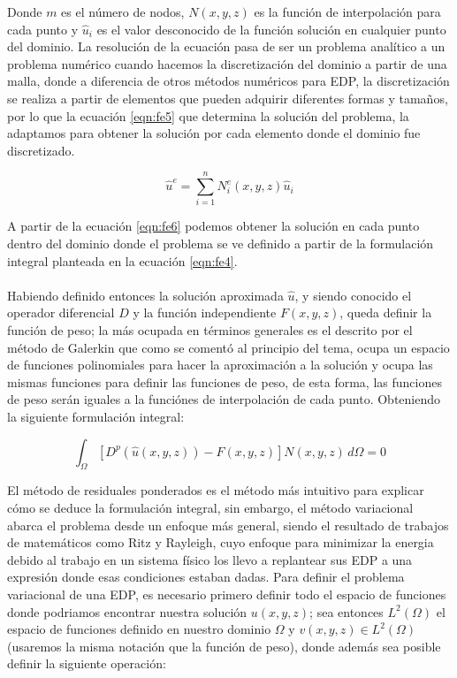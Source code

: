 Donde $m$ es el número de nodos, $N(x,y,z)$ es la función de interpolación para cada punto y $\hat{u}_{i}$ es el valor desconocido de la función solución en cualquier punto del dominio. La resolución de la ecuación pasa de ser un problema analítico a un problema numérico cuando hacemos la discretización del dominio a partir de una malla, donde a diferencia de otros métodos numéricos para EDP, la discretización se realiza a partir de elementos que pueden adquirir diferentes formas y tamaños, por lo que la ecuación \ref{eqn:fe5} que determina la solución del problema, la adaptamos para obtener la solución por cada elemento donde el dominio fue discretizado. 

\begin{equation}
\label{eqn:fe6}
    \hat{u}^{e}=\displaystyle\sum_{i=1}^n  N_{i}^{e}(x,y,z){\hat{u}_{i}}        
\end{equation}

A partir de la ecuación \ref{eqn:fe6} podemos obtener la solución en cada punto dentro del dominio donde el problema se ve definido a partir de la formulación integral planteada en la ecuación \ref{eqn:fe4}. 
\\
\\
Habiendo definido entonces la solución aproximada $\hat{u}$, y siendo conocido el operador diferencial $D$ y la función independiente $F(x,y,z)$, queda definir la función de peso; la más ocupada en términos generales es el descrito por el método de Galerkin que como se comentó al principio del tema, ocupa un espacio de funciones polinomiales para hacer la aproximación a la solución y ocupa las mismas funciones para definir las funciones de peso, de esta forma, las funciones de peso serán iguales a la funciónes de interpolación de cada punto. Obteniendo la siguiente formulación integral:

\begin{equation}
\label{eqn:fe7}
  \displaystyle\int_{\Omega}^{} [D^{p}(\hat{u}(x,y,z))-F(x,y,z)] N(x,y,z)\, d\Omega = 0      
\end{equation}
  
El método de residuales ponderados es el método más intuitivo para explicar cómo se deduce la formulación integral, sin embargo, el método variacional abarca el problema desde un enfoque más general, siendo el resultado de trabajos de matemáticos como Ritz y Rayleigh, cuyo enfoque para minimizar la energia debido al trabajo en un sistema físico los llevo a replantear sus EDP a una expresión donde esas condiciones estaban dadas. Para definir el problema variacional de una EDP, es necesario primero definir todo el espacio de funciones donde podriamos encontrar nuestra solución $u(x,y,z)$; sea entonces $L^{2}(\Omega)$ el espacio de funciones definido en nuestro dominio $\Omega$ y  $v(x,y,z){\in}L^{2}(\Omega)$ (usaremos la misma notación que la función de peso), donde además sea posible definir la siguiente operación:

